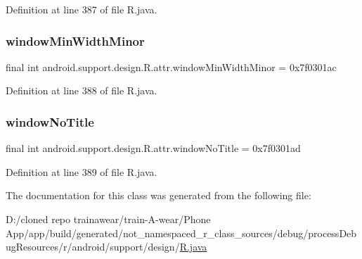 Definition at line 387 of file R.\+java.

\mbox{\label{classandroid_1_1support_1_1design_1_1_r_1_1attr_a1690dd58d6b1695579d1cbdcb36fa7b4}} 
\subsubsection{\texorpdfstring{windowMinWidthMinor}{windowMinWidthMinor}}
{\footnotesize\ttfamily final int android.\+support.\+design.\+R.\+attr.\+window\+Min\+Width\+Minor = 0x7f0301ac\hspace{0.3cm}{\ttfamily [static]}}



Definition at line 388 of file R.\+java.

\mbox{\label{classandroid_1_1support_1_1design_1_1_r_1_1attr_ae7659b443bdf6ecfbb0bb28a213c6670}} 
\subsubsection{\texorpdfstring{windowNoTitle}{windowNoTitle}}
{\footnotesize\ttfamily final int android.\+support.\+design.\+R.\+attr.\+window\+No\+Title = 0x7f0301ad\hspace{0.3cm}{\ttfamily [static]}}



Definition at line 389 of file R.\+java.



The documentation for this class was generated from the following file\+:\begin{DoxyCompactItemize}
\item 
D\+:/cloned repo trainawear/train-\/\+A-\/wear/\+Phone App/app/build/generated/not\+\_\+namespaced\+\_\+r\+\_\+class\+\_\+sources/debug/process\+Debug\+Resources/r/android/support/design/\mbox{\hyperlink{process_debug_resources_2r_2android_2support_2design_2_r_8java}{R.\+java}}\end{DoxyCompactItemize}
